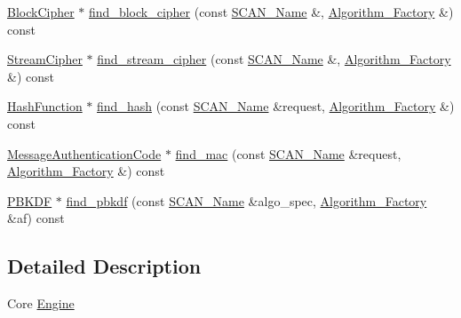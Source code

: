 \begin{DoxyCompactItemize}
\item 
\hyperlink{classBotan_1_1BlockCipher}{Block\-Cipher} $\ast$ \hyperlink{classBotan_1_1Core__Engine_ae5bd39b06aaacbb5291e4174a9666072}{find\-\_\-block\-\_\-cipher} (const \hyperlink{classBotan_1_1SCAN__Name}{S\-C\-A\-N\-\_\-\-Name} \&, \hyperlink{classBotan_1_1Algorithm__Factory}{Algorithm\-\_\-\-Factory} \&) const 
\item 
\hyperlink{classBotan_1_1StreamCipher}{Stream\-Cipher} $\ast$ \hyperlink{classBotan_1_1Core__Engine_a39a8b90a8080e5c4cd373b1d64a1fa2b}{find\-\_\-stream\-\_\-cipher} (const \hyperlink{classBotan_1_1SCAN__Name}{S\-C\-A\-N\-\_\-\-Name} \&, \hyperlink{classBotan_1_1Algorithm__Factory}{Algorithm\-\_\-\-Factory} \&) const 
\item 
\hyperlink{classBotan_1_1HashFunction}{Hash\-Function} $\ast$ \hyperlink{classBotan_1_1Core__Engine_acd9103b90ec18fcd8cf825e5fb0cdf97}{find\-\_\-hash} (const \hyperlink{classBotan_1_1SCAN__Name}{S\-C\-A\-N\-\_\-\-Name} \&request, \hyperlink{classBotan_1_1Algorithm__Factory}{Algorithm\-\_\-\-Factory} \&) const 
\item 
\hyperlink{classBotan_1_1MessageAuthenticationCode}{Message\-Authentication\-Code} $\ast$ \hyperlink{classBotan_1_1Core__Engine_a9c4b919d98f18e5254528fec49257b1a}{find\-\_\-mac} (const \hyperlink{classBotan_1_1SCAN__Name}{S\-C\-A\-N\-\_\-\-Name} \&request, \hyperlink{classBotan_1_1Algorithm__Factory}{Algorithm\-\_\-\-Factory} \&) const 
\item 
\hyperlink{classBotan_1_1PBKDF}{P\-B\-K\-D\-F} $\ast$ \hyperlink{classBotan_1_1Core__Engine_a49e5ca2580f4468ff53c69b3ed2ee52f}{find\-\_\-pbkdf} (const \hyperlink{classBotan_1_1SCAN__Name}{S\-C\-A\-N\-\_\-\-Name} \&algo\-\_\-spec, \hyperlink{classBotan_1_1Algorithm__Factory}{Algorithm\-\_\-\-Factory} \&af) const 
\end{DoxyCompactItemize}


\subsection{Detailed Description}
Core \hyperlink{classBotan_1_1Engine}{Engine} 

